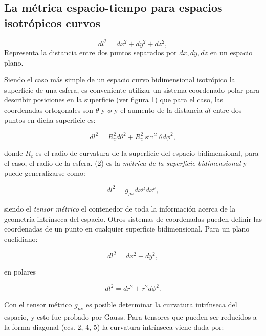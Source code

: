 \documentclass{article}
\begin{document}
   \vspace{0.5cm}

\subsection{La métrica espacio-tiempo para espacios isotrópicos curvos}

\begin{equation}
  dl^2 = dx^2 + dy^2 + dz^2,  
\end{equation}
Representa la distancia entre dos puntos separados por $dx, dy, dz$ en un espacio plano. 

Siendo el caso más simple de un espacio curvo bidimensional isotrópico la superficie de una esfera, es conveniente utilizar un sistema coordenado polar para describir posiciones en la superficie (ver figura 1) que para el caso, las coordenadas ortogonales son $\theta$ y $\phi$ y el aumento de la distancia $dl$ entre dos puntos en dicha superficie es:

\begin{equation}
    dl^2 = R_c^2 d\theta^2 + R_c^2 \sin^2 \theta d\phi^2,
\end{equation}

    donde $R_c$ es el radio de curvatura de la superficie del espacio bidimensional, para el caso, el radio de la esfera. (2) es la {\textit{métrica de la superficie bidimensional}} y puede generalizarse como:
    
    \begin{equation}
        dl^2 = g_{\mu \nu} dx^{\mu} dx^{\nu}, 
    \end{equation}
    
    siendo el {\textit{tensor métrico}} el contenedor de toda la información acerca de la geometría intrínseca del espacio. Otros sistemas de coordenadas pueden definir las coordenadas de un punto en cualquier superficie bidimensional. Para un plano euclidiano: 

\begin{equation}
    dl^2 = dx^2 +  dy^2,
\end{equation}

en polares

\begin{equation}
    dl^2 = dr^2 + r^2 d\phi^2.
\end{equation}

Con el tensor métrico $g_{\mu \nu}$ es posible determinar la curvatura intrínseca del espacio, y esto fue probado por Gauss. Para tensores que pueden ser reducidos a la forma diagonal (ecs. 2, 4, 5) la curvatura intrínseca viene dada por:
\end{document}
